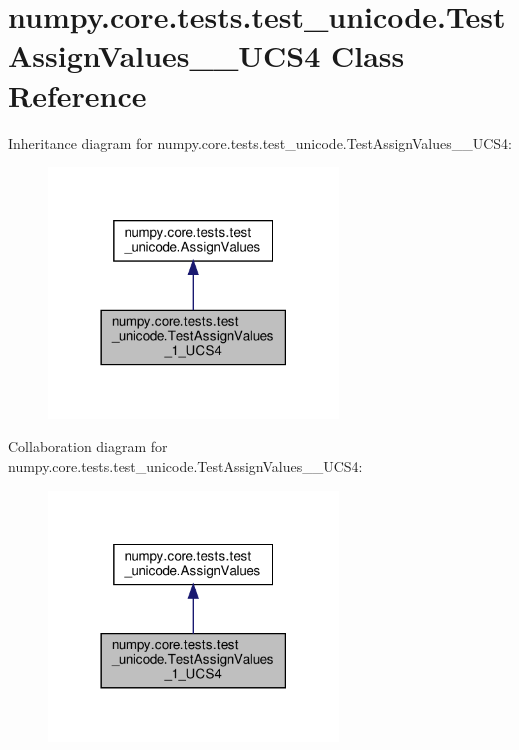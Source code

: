 \hypertarget{classnumpy_1_1core_1_1tests_1_1test__unicode_1_1TestAssignValues__1__UCS4}{}\section{numpy.\+core.\+tests.\+test\+\_\+unicode.\+Test\+Assign\+Values\+\_\+\_\+\+U\+C\+S4 Class Reference}
\label{classnumpy_1_1core_1_1tests_1_1test__unicode_1_1TestAssignValues__1__UCS4}


Inheritance diagram for numpy.\+core.\+tests.\+test\+\_\+unicode.\+Test\+Assign\+Values\+\_\+\_\+\+U\+C\+S4\+:
\nopagebreak
\begin{figure}[H]
\begin{center}
\leavevmode
\includegraphics[width=218pt]{classnumpy_1_1core_1_1tests_1_1test__unicode_1_1TestAssignValues__1__UCS4__inherit__graph}
\end{center}
\end{figure}


Collaboration diagram for numpy.\+core.\+tests.\+test\+\_\+unicode.\+Test\+Assign\+Values\+\_\+\_\+\+U\+C\+S4\+:
\nopagebreak
\begin{figure}[H]
\begin{center}
\leavevmode
\includegraphics[width=218pt]{classnumpy_1_1core_1_1tests_1_1test__unicode_1_1TestAssignValues__1__UCS4__coll__graph}
\end{center}
\end{figure}
